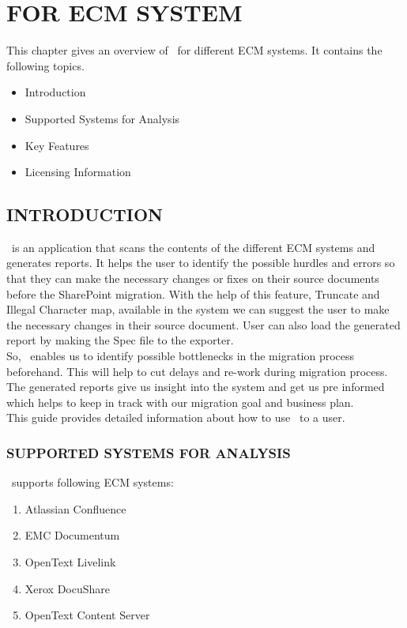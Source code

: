 \chapter{\MakeUppercase{\appName} FOR ECM SYSTEM}
This chapter gives an overview of \appName\ for different ECM systems. It contains the following topics.
\begin{itemize}
  \item Introduction
  \item Supported Systems for Analysis
  \item Key Features
  \item Licensing Information
\end{itemize}
 \section{INTRODUCTION}
 \appName\ is an application that scans the contents of the different ECM systems and generates reports. It helps the user to identify the possible hurdles and errors so that they can make the necessary changes or fixes on their source documents before the SharePoint migration. With the help of this feature, Truncate and Illegal Character map, available in the system we can suggest the user to make the necessary changes in their source document. User can also load the generated report by making the Spec file to the exporter.
 \\
So, \appName\ enables us to identify possible bottlenecks in the migration process beforehand. This will help to cut delays and re-work during migration process. The generated reports give us insight into the system and get us pre informed which helps to keep in track with our migration goal and business plan.
 \\
This guide provides detailed information about how to use \appName\ to a user.
\subsection{SUPPORTED SYSTEMS FOR ANALYSIS}
\appName\ supports following ECM systems:
 \\
\begin{enumerate}
  \item Atlassian Confluence
  \item EMC Documentum
  \item OpenText Livelink
  \item Xerox DocuShare
  \item OpenText Content Server
\end{enumerate}
